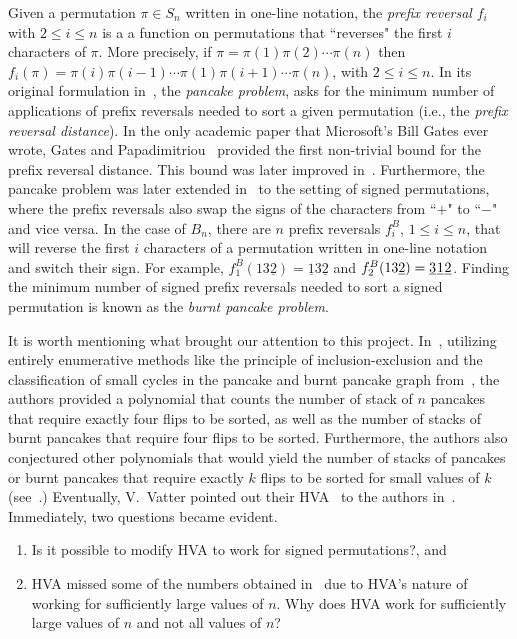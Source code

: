 \documentclass{article}
\numberwithin{equation}{section}
\theoremstyle{definition}
\begin{document}
 Given a permutation $\pi\in S_n$ written in one-line notation, the \emph{prefix reversal} $f_i$ with $2\leq i\leq n$ is a a function on permutations that ``reverses" the first $i$ characters of $\pi$. More precisely, if $\pi=\pi(1)\pi(2)\cdots\pi(n)$ then $f_i(\pi)=\pi(i)\pi(i-1)\cdots \pi(1)\pi(i+1)\cdots\pi(n)$, with $2\leq i\leq n$. In its original formulation in~\cite{Dweighter75}, the \emph{pancake problem}, asks for the minimum number of applications of prefix reversals needed to sort a given permutation (i.e., the \emph{prefix reversal distance}). In the only academic paper that Microsoft's Bill Gates ever wrote, Gates and Papadimitriou~\cite{GatesPapa} provided the first non-trivial bound for the prefix reversal distance. This bound was later improved in~\cite{Chitt}. Furthermore, the pancake problem was later extended in~\cite{GatesPapa} to the setting of signed permutations, where the prefix reversals also swap the signs of the characters from ``$+$" to ``$-$" and vice versa. In the case of $B_n$, there are $n$ prefix reversals $f^B_i$, $1\leq i\leq n$, that will reverse the first $i$ characters of a permutation written in one-line notation and switch their sign. For example, $f^B_1(13\underline{2})=\underline{1}3\underline{2}$ and $f^B_2(13\underline{2})=\underline{3}\hspace{0.02cm}\underline{1}\hspace{0.02cm}\underline{2}$. Finding the minimum number of signed prefix reversals needed to sort a signed permutation is known as the \emph{burnt pancake problem}.


It is worth mentioning what brought our attention to this project. In~\cite{BBP19Perm}, utilizing entirely enumerative methods like the principle of inclusion-exclusion and the classification of small cycles in the pancake and burnt pancake graph from~\cite{BBP19,BBP19Perm}, the authors provided a polynomial that counts the number of stack of $n$ pancakes that require exactly four flips to be sorted, as well as the number of stacks of burnt pancakes that require four flips to be sorted. Furthermore, the authors also conjectured other polynomials that would yield the number of stacks of pancakes or burnt pancakes that require exactly $k$ flips to be sorted for small values of $k$ (see~\cite[Section 6]{BBP19Perm}.) Eventually, V.~Vatter pointed out their HVA~\cite{HV16} to the authors in~\cite{BBP19Perm}. Immediately, two questions became evident.
\begin{enumerate}
    \item[Q1:] Is it possible to modify HVA to work for signed permutations?, and
    \item[Q2:] HVA missed some of the numbers obtained in~\cite{BBP19Perm} due to HVA's nature of working for sufficiently large values of $n$. Why does HVA work for sufficiently large values of $n$ and not all values of $n$?
\end{enumerate}
\end{document}
